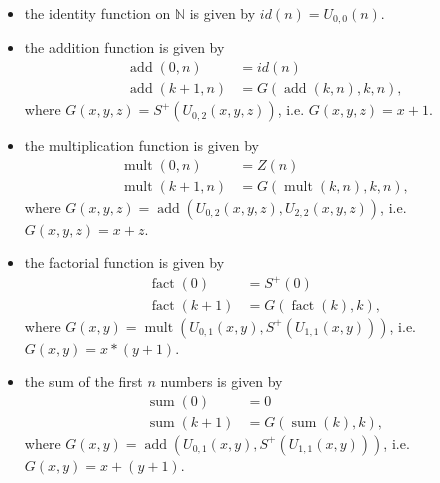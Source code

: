 \documentclass[a4paper, openany]{memoir}
\theoremstyle{definition}
\begin{document}
    \begin{itemize}
        \item the identity function on $\mathbb{N}$ is given by $id(n) = U_{0, 0}(n)$.
        
        \item the addition function is given by
        \begin{align*}
            \operatorname{add}(0, n) &= id(n) \\
            \operatorname{add}(k+1, n) &= G(\operatorname{add}(k, n), k, n),
        \end{align*}
        where $G(x, y, z) = S^+(U_{0, 2}(x, y, z))$, i.e. $G(x, y, z) = x+1$.

        \item the multiplication function is given by
        \begin{align*}
            \operatorname{mult}(0, n) &= Z(n) \\
            \operatorname{mult}(k+1, n) &= G(\operatorname{mult}(k, n), k, n),
        \end{align*}
        where $G(x, y, z) = \operatorname{add}(U_{0, 2}(x, y, z), U_{2, 2}(x, y, z))$, i.e. $G(x, y, z) = x + z$.

        \item the factorial function is given by
        \begin{align*}
            \operatorname{fact}(0) &= S^+(0) \\
            \operatorname{fact}(k+1) &= G(\operatorname{fact}(k), k),
        \end{align*}
        where $G(x, y) = \operatorname{mult}(U_{0, 1}(x, y), S^+(U_{1, 1}(x, y)))$, i.e. $G(x, y) = x * (y+1)$.

        \item the sum of the first $n$ numbers is given by
        \begin{align*}
            \operatorname{sum}(0) &= 0 \\
            \operatorname{sum}(k+1) &= G(\operatorname{sum}(k), k),
        \end{align*}
        where $G(x, y) = \operatorname{add}(U_{0, 1}(x, y), S^+(U_{1, 1}(x, y)))$, i.e. $G(x, y) = x + (y + 1)$.
    \end{itemize}
\end{document}
